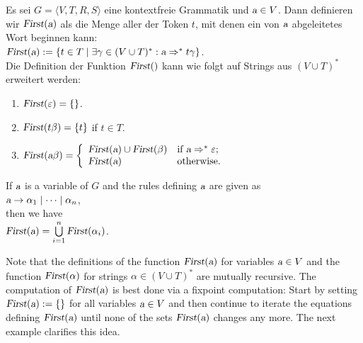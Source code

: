 \begin{Definition}
Es sei $G = \langle V, T, R, S \rangle$ eine kontextfreie Grammatik und $\textsl{a} \in V$.
Dann definieren wir $\textsl{First}(\textsl{a})$ als die Menge aller der Token $t$, mit denen ein
von $\textsl{a}$ abgeleitetes Wort beginnen kann:
\\[0.2cm]
\hspace*{1.3cm}
$\textsl{First}(\textsl{a}) := \{ t \in T \mid \exists \gamma \in (V \cup T)^*: \textsl{a} \Rightarrow^* t\gamma \}$.
\\[0.2cm]
Die Definition der Funktion $\textsl{First}()$ kann wie folgt auf Strings aus $(V \cup T)^*$ 
erweitert werden: 
\begin{enumerate}
\item $\textsl{First}(\varepsilon) = \{\}$.
\item $\textsl{First}(t \beta) = \{ t \}$ \quad if $t \in T$.
\item $\textsl{First}(\textsl{a} \beta) = \left\{
       \begin{array}[c]{ll}
         \textsl{First}(\textsl{a}) \cup \textsl{First}(\beta) & \mbox{if $\textsl{a} \Rightarrow^* \varepsilon$;} \\
         \textsl{First}(\textsl{a})                            & \mbox{otherwise.}
       \end{array}
       \right.
      $ 
\end{enumerate}
If $\textsl{a}$ is a variable of $G$ and the rules defining $\textsl{a}$ are given as 
\\[0.2cm]
\hspace*{1.3cm}
$\textsl{a} \rightarrow \alpha_1 \mid \cdots \mid \alpha_n$,
\\[0.2cm]
then we have
\\[0.2cm]
\hspace*{1.3cm}
$\textsl{First}(\textsl{a}) = \bigcup\limits_{i=1}^n \textsl{First}(\alpha_i)$.   \eox
\end{Definition}

\remarkEng
Note that the definitions of the function $\textsl{First}(\textsl{a})$ for variables
$\textsl{a} \in V$ and the function $\textsl{First}(\alpha)$ for strings $\alpha \in (V \cup T)^*$
are mutually recursive.  The computation of $\textsl{First}(\textsl{a})$ is best done via a 
fixpoint computation:  Start by setting $\textsl{First}(\textsl{a}) := \{\}$ for all variables $\textsl{a}\in V$ and
then continue to iterate the equations defining $\textsl{First}(\textsl{a})$ until none of the sets
$\textsl{First}(\textsl{a})$ changes any more.  The next example clarifies this idea.

